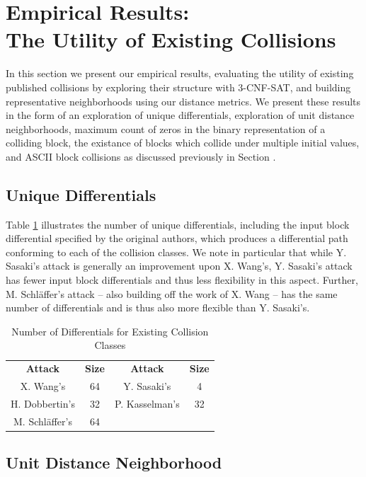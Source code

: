 \documentclass[conference]{IEEEtran}
\begin{document}
\section{Empirical Results:\\The Utility of Existing Collisions}
\label{Sec:Empirical}

In this section we present our empirical results, evaluating the
utility of existing published collisions by exploring their structure
with 3-CNF-SAT, and building representative neighborhoods using our
distance metrics.  We present these results in the form of an
exploration of unique differentials, exploration of unit distance
neighborhoods, maximum count of zeros in the binary representation of
a colliding block, the existance of blocks which collide under
multiple initial values, and ASCII block collisions as discussed
previously in Section \label{Sec:Intuition}.

\subsection{Unique Differentials} \label{empirical:differentials}

Table \ref{table:differentials} illustrates the number of unique differentials,
including the input block differential specified by the original authors, which produces a differential path conforming to
each of the collision classes. We note in particular that while Y. Sasaki's
attack is generally an improvement upon X. Wang's, Y. Sasaki's attack has fewer
input block differentials and thus less flexibility in this aspect. Further,
M. Schl{\"a}ffer's attack -- also building off the work of X. Wang -- has the
same number of differentials and is thus also more flexible than Y. Sasaki's.

\begin{table}
    \caption{Number of Differentials for Existing Collision Classes}
    \label{table:differentials}
    \begin{tabular}{c c c c}
        \textbf{Attack} & \textbf{Size} & \textbf{Attack} & \textbf{Size} \\
        X. Wang's & 64 & Y. Sasaki's & 4 \\
        H. Dobbertin's & 32 & P. Kasselman's & 32 \\
        M. Schl{\"a}ffer's & 64 & & \\
    \end{tabular}
\end{table}

\subsection{Unit Distance Neighborhood} \label{empirical:neighborhood}
\end{document}
